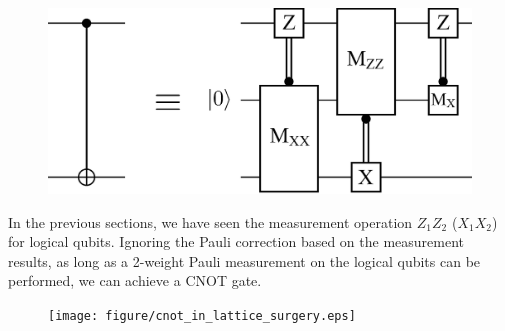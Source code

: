 \documentclass[a4paper,11pt]{ltjsarticle}
\begin{document}
{{        \begin{figure}[h]
            \centering
            \includegraphics[scale=0.30]{figure/logical_cnot.eps}
            \vspace{0pt}\caption{}
            \label{logical_cnot}
            \vspace{-10pt}
        \end{figure}

        In the previous sections, we have seen the measurement operation $Z_1Z_2$ ($X_1X_2$) for logical qubits. Ignoring the Pauli correction based on the measurement results, as long as a 2-weight Pauli measurement on the logical qubits can be performed, we can achieve a CNOT gate.

        \begin{figure}[h]
            \centering
            \texttt{[image: figure/cnot\_in\_lattice\_surgery.eps]}
            \vspace{0pt}\caption{}
            \label{cnot_in_lattice_surgery}
            \vspace{-10pt}
        \end{figure}


    }
}
\end{document}
